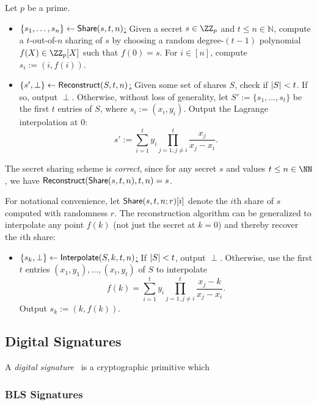 \begin{construction}
Let $p$ be a prime.
    \begin{itemize}
        \item \underline{$\{s_1, \dots, s_n\} \gets \mathsf{Share}(s, t, n)$:} Given a secret $s \in \ZZ_p$ and $t \leq n \in \mathbb{N}$, compute a $t$-out-of-$n$ sharing of $s$ by choosing a random degree-$(t-1)$ polynomial $f(X) \in \ZZ_p[X]$ such that $f(0) = s$. For $i \in [n]$, compute $s_i := (i, f(i))$.
        \item \underline{$\{s', \perp\} \gets \mathsf{Reconstruct}(S, t, n)$:} Given some set of shares $S$, check if $\lvert S \rvert < t$. If so, output $\perp$. Otherwise, without loss of generality, let $S' := \{s_1, \dots, s_t\}$ be the first $t$ entries of $S$, where $s_i := (x_i, y_i)$. Output the Lagrange interpolation at 0:
        \[
            s' := \sum_{i=1}^t y_i \prod_{j=1, j \neq i}^t \frac{x_j}{x_j - x_i}.
        \]
    \end{itemize}
\end{construction}

The secret sharing scheme is \emph{correct}, since for any secret $s$ and values $t \leq n \in \NN$, we have $\mathsf{Reconstruct}(\mathsf{Share}(s, t, n),\allowbreak t, n) = s$. 

For notational convenience, let $\mathsf{Share}(s,t,n; r)[i]$ denote the $i$th share of $s$ computed with randomness $r$. The reconstruction algorithm can be generalized to interpolate any point $f(k)$ (not just the secret at $k=0$) and thereby recover the $i$th share:
\begin{itemize}
    \item \underline{$\{s_k,\perp\} \gets {\sf Interpolate}(S, k, t, n)$:} If $\lvert S \rvert < t$, output $\perp$. Otherwise, use the first $t$ entries $(x_1, y_1), \dots,\allowbreak (x_t, y_t)$ of $S$ to interpolate
    \[
        f(k) = \sum_{i=1}^t y_i \prod_{j=1, j \neq i}^t \frac{x_j - k}{x_j - x_i}.
    \]
    Output $s_k := (k, f(k))$.
\end{itemize}

\subsection{Digital Signatures}\label{sec:signatures}

A \emph{digital signature}~ is a cryptographic primitive which 

\subsubsection{BLS Signatures}\label{sec:bls}

